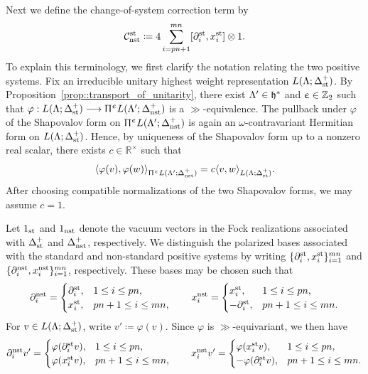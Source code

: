 Next we define the change-of-system correction term by
\begin{equation}
\mathcal C^{{\text{st}}}_{{\text{nst}}}
\coloneqq 4
\sum_{i=pn+1}^{mn}[\partial_i^{{\text{st}}},x_i^{{\text{st}}}]\otimes1.
\end{equation}
To explain this terminology, we first clarify the notation relating the two positive systems. Fix an irreducible unitary highest weight representation $L(\Lambda;\Delta_{{\text{st}}}^{+})$. By Proposition~\ref{prop::transport_of_unitarity}, there exist $\Lambda'\in{\mathfrak h}^{\ast}$ and $\upepsilon\in{\mathbb Z}_2$ such that
$\varphi:L(\Lambda;\Delta_{{\text{st}}}^{+})\longrightarrow \Uppi^{\upepsilon}L(\Lambda';\Delta_{{\text{nst}}}^{+})$
is a $\gg$-equivalence. The pullback under $\varphi$ of the Shapovalov form on $ \Uppi^{\upepsilon}L(\Lambda';\Delta_{{\text{nst}}}^{+})$ is again an $\omega$-contravariant Hermitian form on $L(\Lambda;\Delta_{{\text{st}}}^{+})$. Hence, by uniqueness of the Shapovalov form up to a nonzero real scalar, there exists $c\in\mathbb R^{\times}$ such that
\begin{equation*}
\langle\varphi(v),\varphi(w)\rangle_{ \Uppi^{\upepsilon}L(\Lambda';\Delta_{{\text{nst}}}^{+})}
=
c\langle v,w\rangle_{L(\Lambda;\Delta_{{\text{st}}}^{+})}.
\end{equation*}
After choosing compatible normalizations of the two Shapovalov forms, we may assume $c=1$.

Let $1_{{\text{st}}}$ and $1_{{\text{nst}}}$ denote the vacuum vectors in the Fock realizations associated with $\Delta_{{\text{st}}}^{+}$ and $\Delta_{{\text{nst}}}^{+}$, respectively. We distinguish the polarized bases associated with the standard and non-standard positive systems by writing $\{\partial_i^{{\text{st}}},x_i^{{\text{st}}}\}_{i=1}^{mn}$ and $\{\partial_i^{{\text{nst}}},x_i^{{\text{nst}}}\}_{i=1}^{mn}$, respectively. These bases may be chosen such that
\begin{equation}
\partial_i^{{\text{nst}}}
=
\begin{cases}
\partial_i^{{\text{st}}}, & 1\leq i\leq pn,\\
x_i^{{\text{st}}}, & pn+1\leq i\leq mn,
\end{cases}
\qquad
x_i^{{\text{nst}}}
=
\begin{cases}
x_i^{{\text{st}}}, & 1\leq i\leq pn,\\
-\partial_i^{{\text{st}}}, & pn+1\leq i\leq mn.
\end{cases}
\end{equation}
For $v\in L(\Lambda;\Delta_{{\text{st}}}^{+})$, write $v'\coloneqq\varphi(v)$. Since $\varphi$ is $\gg$-equivariant, we then have
\begin{equation}
\partial_i^{{\text{nst}}}v'
=
\begin{cases}
\varphi(\partial_i^{{\text{st}}}v), & 1\leq i\leq pn,\\
\varphi(x_i^{{\text{st}}}v), & pn+1\leq i\leq mn,
\end{cases}
\qquad
x_i^{{\text{nst}}}v'
=
\begin{cases}
\varphi(x_i^{{\text{st}}}v), & 1\leq i\leq pn,\\
-\varphi(\partial_i^{{\text{st}}}v), & pn+1\leq i\leq mn.
\end{cases}
\end{equation}


